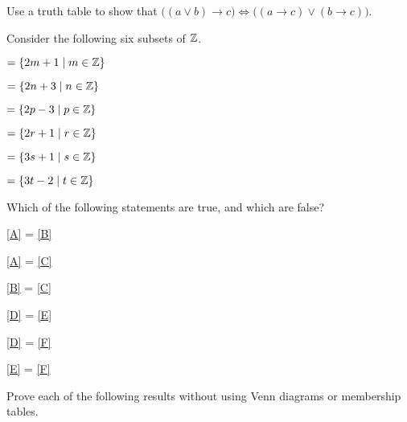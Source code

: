 \documentclass[a4paper, english, 12pt]{article} %
\begin{document}
\titlebox


\begin{problem}[7]
  Use a truth table to show that $\bigl( (a \vee b) \longrightarrow c \bigr)
  \Leftrightarrow
  \bigl( (a \longrightarrow c) \vee (b \longrightarrow c) \bigr)$.
\end{problem}


\begin{problem}[6]
  Consider the following six subsets of $\mathbb{Z}$.

  \begin{centering}
    \noindent \!\!\!\!
  \begin{enumerate*}[itemjoin=\tab, label = $\Alph*$]
    \item \label{A} $= \{ 2m + 1 \mid m \in \mathbb{Z} \}$ 
    \item \label{B} $= \{ 2n + 3 \mid n \in \mathbb{Z} \}$
    \item \label{C} $= \{ 2p - 3 \mid p \in \mathbb{Z} \}$
    \item \label{D} $= \{ 2r + 1 \mid r \in \mathbb{Z} \}$ 
    \item \label{E} $= \{ 3s + 1 \mid s \in \mathbb{Z} \}$
    \item \label{F} $= \{ 3t - 2 \mid t \in \mathbb{Z} \}$
    \end{enumerate*}
  \end{centering}
  
  Which of the following statements are true, and which are false?
\end{problem}

\begin{centering}
  \begin{enumerate*}[itemjoin=\tab, label = \textbf{\alph*)}]
  \item \ref{A} = \ref{B}  
  \item \ref{A} = \ref{C} 
  \item \ref{B} = \ref{C} 
  \item \ref{D} = \ref{E} 
  \item \ref{D} = \ref{F} 
  \item \ref{E} = \ref{F} 
  \end{enumerate*}
\end{centering}


\begin{problem}[6]
  Prove each of the following results without using Venn diagrams or membership tables.
\end{problem}
\end{document}
